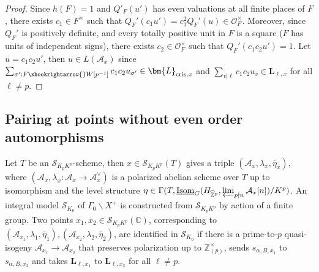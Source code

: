 \documentclass{amsart}
\numberwithin{equation}{subsection}
\numberwithin{theorem}{section}
\theoremstyle{definition}
\theoremstyle{remark}
\newcommand{\bC}{\mathbb{C}}
\newcommand{\bZ}{\mathbb{Z}}
\newcommand{\cA}{\mathcal{A}}
\newcommand{\cO}{\mathcal{O}}
\newcommand{\Isom}{\underline{\mathrm{Isom}}}
\begin{document}
\begin{proof}
    Since $h(F) = 1$ and $Q'_F(u')$ has even valuations at all finite places of $F$, there exists $c_1\in F^\times$ such that $Q_F'(c_1u') = c_1^2 Q_F'(u)\in \cO_F^\times$. Moreover, since $Q_F'$ is positively definite, and every totally positive unit in $F$ is a square ($F$ has units of independent signs), there exists $c_2\in \cO_F^\times$ such that $Q_F'(c_1c_2u') = 1$. Let $u = c_1c_2 u'$, then $u\in L(\cA_x)$ since $\sum_{\sigma':F\xhookrightarrow{}W[p^{-1}]}c_1c_2 u_{\sigma'} \in \bm{L}_{\mathrm{cris},x}$ and $\sum_{v|\ell} c_1c_2 u_v \in \bm{L}_{\ell,x}$ for all $\ell\neq p$. 
\end{proof}



\subsection{Pairing at points without even order automorphisms}

Let $T$ be an $\mathscr{S}_{K_pK^p}$-scheme, then $x\in \mathscr{S}_{K_pK^p}(T)$ gives a triple $(\cA_x, \lambda_x, \bar{\eta}_x)$, where $(\cA_x, \lambda_x: \cA_x\to \cA_x^\vee)$ is a polarized abelian scheme over $T$ up to isomorphism 
and the level structure $\eta\in \Gamma(T, \Isom_G(H_{\widehat{\bZ}^p} , \varprojlim_{p\nmid n}\cA_x[n])/K^p)$. 
An integral model $\mathscr{S}_{K_0}$ of $\Gamma_0 \backslash X^+$ is constructed from  $\mathscr{S}_{K_pK^p}$ by action of a finite group.
Two points $x_1, x_2 \in \mathscr{S}_{K_pK^p}(\bC)$, corresponding to $(\cA_{x_1}, \lambda_1, \bar{\eta}_1), (\cA_{x_2}, \lambda_2, \bar{\eta}_2)$, are identified in $\mathscr{S}_{K_0}$ if there is a prime-to-$p$ quasi-isogeny $\cA_{x_1} \to \cA_{x_2}$ that preserves polarization up to $\bZ_{(p)}^\times$, sends $s_{\alpha, B, x_1}$ to $s_{\alpha, B, x_2}$ and  takes $\bm{L}_{\ell,x_1}$ to $\bm{L}_{\ell,x_2}$ for all $\ell\neq p$. 
\end{document}
